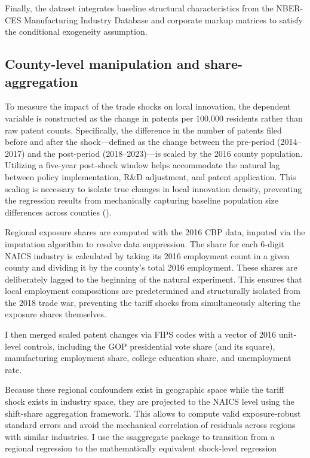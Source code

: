 \documentclass[12pt]{article}
\numberwithin{figure}{section}
\numberwithin{table}{section}
\begin{document}
Finally, the dataset integrates baseline structural characteristics from the NBER-CES Manufacturing Industry Database and corporate markup matrices to satisfy the conditional exogeneity assumption.

\subsection{County-level manipulation and share-aggregation}

To measure the impact of the trade shocks on local innovation, the dependent variable is constructed as the change in patents per 100,000 residents rather than raw patent counts. Specifically, the difference in the number of patents filed before and after the shock—defined as the change between the pre-period (2014–2017) and the post-period (2018–2023)—is scaled by the 2016 county population. Utilizing a five-year post-shock window helps accommodate the natural lag between policy implementation, R\&D adjustment, and patent application. This scaling is necessary to isolate true changes in local innovation density, preventing the regression results from mechanically capturing baseline population size differences across counties (\cite{Chetty2019}).

Regional exposure shares are computed with the 2016 CBP data, imputed via the \cite{Eckert2020} imputation algorithm to resolve data suppression. The share for each 6-digit NAICS industry is calculated by taking its 2016 employment count in a given county and dividing it by the county's total 2016 employment. These shares are deliberately lagged to the beginning of the natural experiment. This ensures that local employment compositions are predetermined and structurally isolated from the 2018 trade war, preventing the tariff shocks from simultaneously altering the exposure shares themselves.

I then merged scaled patent changes via FIPS codes with a vector of 2016 unit-level controls, including the GOP presidential vote share (and its square), manufacturing employment share, college education share, and unemployment rate.

Because these regional confounders exist in geographic space while the tariff shock exists in industry space, they are projected to the NAICS level using the \cite{BHJ2022} shift-share aggregation framework. This allows to compute valid exposure-robust standard errors and avoid the mechanical correlation of residuals across regions with similar industries. I use the ssaggregate package to transition from a regional regression to the mathematically equivalent shock-level regression
\end{document}
